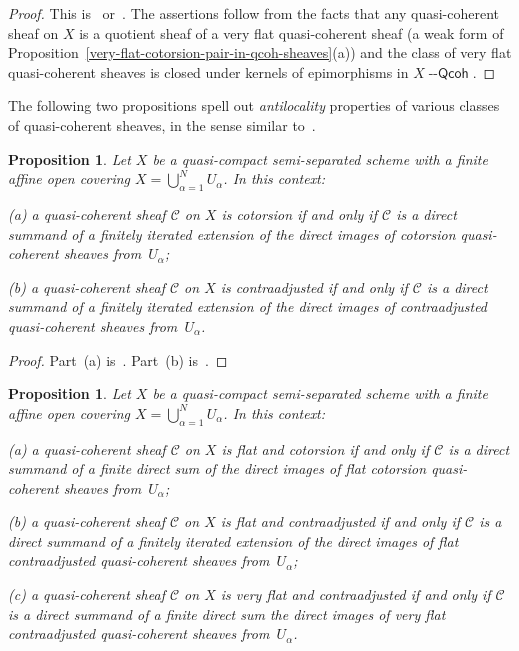 \documentclass[12pt,a4paper]{amsart}
\newcommand{\+}{\protect\nobreakdash-}
\renewcommand{\:}{\colon}
\newcommand{\Qcoh}{{\operatorname{\mathsf{--Qcoh}}}}
\newcommand{\cC}{\mathcal C}
\theoremstyle{plain}
\newtheorem{prop}[thm]{Proposition}
\theoremstyle{definition}
\begin{document}
\begin{proof}
 This is~\cite[Corollary~4.1.2]{Pcosh} or~\cite[Corollary~7.5.3]{Pform}.
 The assertions follow from the facts that any quasi-coherent sheaf
on $X$ is a quotient sheaf of a very flat quasi-coherent sheaf (a weak
form of Proposition~\ref{very-flat-cotorsion-pair-in-qcoh-sheaves}(a))
and the class of very flat quasi-coherent sheaves is closed under
kernels of epimorphisms in $X\Qcoh$.
\end{proof}

 The following two propositions spell out \emph{antilocality}
properties of various classes of quasi-coherent sheaves,
in the sense similar to~\cite[Section~4]{Pal}.

\begin{prop} \label{cta-and-cot-quasi-coherent-sheaves-prop}
 Let $X$ be a quasi-compact semi-separated scheme with a finite affine
open covering $X=\bigcup_{\alpha=1}^N U_\alpha$.
 In this context: \par
\textup{(a)} a quasi-coherent sheaf\/ $\cC$ on $X$ is cotorsion if
and only if\/ $\cC$ is a direct summand of a finitely iterated
extension of the direct images of cotorsion quasi-coherent sheaves
from~$U_\alpha$; \par
\textup{(b)} a quasi-coherent sheaf\/ $\cC$ on $X$ is contraadjusted
if and only if\/ $\cC$ is a direct summand of a finitely iterated
extension of the direct images of contraadjusted quasi-coherent sheaves
from~$U_\alpha$.
\end{prop}

\begin{proof}
 Part~(a) is~\cite[Corollary~4.1.11(c)]{Pcosh}.
 Part~(b) is~\cite[Corollary~4.1.4(c)]{Pcosh}.
\end{proof}

\begin{prop} \label{flat-vfl-cta-cot-quasi-coherent-sheaves-prop}
 Let $X$ be a quasi-compact semi-separated scheme with a finite affine
open covering $X=\bigcup_{\alpha=1}^N U_\alpha$.
 In this context: \par
\textup{(a)} a quasi-coherent sheaf\/ $\cC$ on $X$ is flat and
cotorsion if and only if\/ $\cC$ is a direct summand of a finite
direct sum of the direct images of flat cotorsion quasi-coherent
sheaves from~$U_\alpha$; \par
\textup{(b)} a quasi-coherent sheaf\/ $\cC$ on $X$ is flat and
contraadjusted if and only if\/ $\cC$ is a direct summand of a finitely
iterated extension of the direct images of flat contraadjusted
quasi-coherent sheaves from~$U_\alpha$; \par
\textup{(c)} a quasi-coherent sheaf\/ $\cC$ on $X$ is very flat and
contraadjusted if and only if\/ $\cC$ is a direct summand of a finite
direct sum the direct images of very flat contraadjusted quasi-coherent
sheaves from~$U_\alpha$.
\end{prop}
\end{document}
